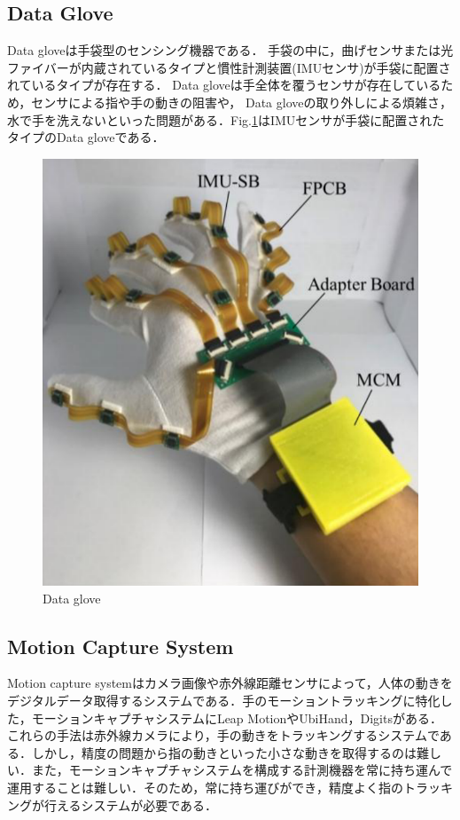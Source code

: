\subsection*{Data Glove}
Data glove\cite{Lin2018,Tarchanidis2003}は手袋型のセンシング機器である．
手袋の中に，曲げセンサまたは光ファイバーが内蔵されているタイプと慣性計測装置(IMUセンサ)が手袋に配置されているタイプが存在する．
Data gloveは手全体を覆うセンサが存在しているため，センサによる指や手の動きの阻害や，
Data gloveの取り外しによる煩雑さ，水で手を洗えないといった問題がある．Fig.\ref{fig:Data glove}はIMUセンサが手袋に配置されたタイプのData gloveである．
\begin{figure}[H]
  \centering
  \includegraphics[width=0.6\linewidth]{fig/ch1/data_glove}
  \caption{Data glove\cite{Lin2018}}
  \label{fig:Data glove}
\end{figure}

\subsection*{Motion Capture System}
Motion capture systemはカメラ画像や赤外線距離センサによって，人体の動きをデジタルデータ取得するシステムである．手のモーショントラッキングに特化した，モーションキャプチャシステムにLeap MotionやUbiHand，Digits\cite{Ahmad2006,Kim2012}がある．これらの手法は赤外線カメラにより，手の動きをトラッキングするシステムである．しかし，精度の問題から指の動きといった小さな動きを取得するのは難しい．また，モーションキャプチャシステムを構成する計測機器を常に持ち運んで運用することは難しい．そのため，常に持ち運びができ，精度よく指のトラッキングが行えるシステムが必要である．

